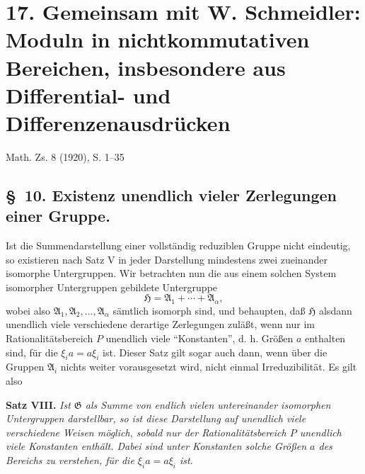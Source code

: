 \documentclass[11pt]{article}
\begin{document}
\section*{17. Gemeinsam mit W. Schmeidler: Moduln in nichtkommutativen Bereichen, insbesondere aus Differential- und Differenzenausdrücken}
\begin{center}
Math. Zs. 8 (1920), S. 1--35
\end{center}

\setcounter{footnote}{19}
\subsection*{\S~10. Existenz unendlich vieler Zerlegungen einer Gruppe.}

Ist die Summendarstellung einer vollständig reduziblen Gruppe nicht eindeutig, so existieren nach Satz V in jeder Darstellung mindestens zwei zueinander isomorphe Untergruppen. Wir betrachten nun die aus einem solchen System isomorpher Untergruppen gebildete Untergruppe
\[
  \mathfrak H=\mathfrak A_1+\cdots+\mathfrak A_\alpha,
\]
wobei also $\mathfrak A_1,\mathfrak A_2,\ldots,\mathfrak A_\alpha$ sämtlich isomorph sind, und behaupten, daß $\mathfrak H$ alsdann unendlich viele verschiedene derartige Zerlegungen zuläßt, wenn nur im Rationalitätsbereich $P$ unendlich viele ``Konstanten'', d. h. Größen $a$ enthalten sind, für die $\xi_i a=a\xi_i$ ist. Dieser Satz gilt sogar auch dann, wenn über die Gruppen $\mathfrak A_i$ nichts weiter vorausgesetzt wird, nicht einmal Irreduzibilität. Es gilt also

\textbf{Satz VIII.} \emph{Ist $\mathfrak G$ als Summe von endlich vielen untereinander isomorphen Untergruppen darstellbar, so ist diese Darstellung auf unendlich viele verschiedene Weisen möglich, sobald nur der Rationalitätsbereich $P$ unendlich viele Konstanten enthält. Dabei sind unter Konstanten solche Größen $a$ des Bereichs zu verstehen, für die $\xi_i a=a\xi_i$ ist.}
\end{document}
